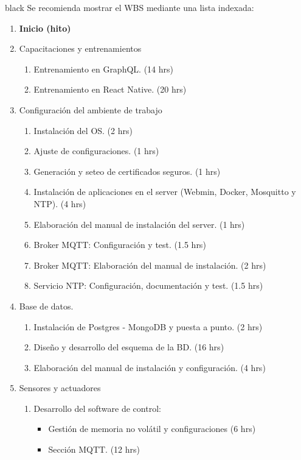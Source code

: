 \documentclass[11pt]{charter}
\begin{document}
\begin{consigna}{black}
Se recomienda mostrar el WBS mediante una lista indexada:

\begin{enumerate}
\item \textbf{Inicio (hito)}
\item Capacitaciones y entrenamientos
	\begin{enumerate}
		\item Entrenamiento en GraphQL. (14 hrs)
		\item Entrenamiento en React Native. (20 hrs)
	\end{enumerate}
\item Configuración del ambiente de trabajo
	\begin{enumerate}
		\item Instalación del OS. (2 hrs)
		\item Ajuste de configuraciones. (1 hrs)
		\item Generación y seteo de certificados seguros. (1 hrs)
		\item Instalación de aplicaciones en el server (Webmin, Docker, Mosquitto y NTP). (4 hrs)
		\item Elaboración del manual de instalación del server. (1 hrs)
		\item Broker MQTT: Configuración y test. (1.5 hrs)
		\item Broker MQTT: Elaboración del manual de instalación. (2 hrs)
		\item Servicio NTP: Configuración, documentación y test. (1.5 hrs)
	\end{enumerate}
\item Base de datos.
	\begin{enumerate}
		\item Instalación de Postgres - MongoDB y puesta a punto. (2 hrs)
		\item Diseño y desarrollo del esquema de la BD. (16 hrs)
		\item Elaboración del manual de instalación y configuración. (4 hrs)
	\end{enumerate}
\item Sensores y actuadores
	\begin{enumerate}
		\item Desarrollo del software de control:
		\begin{itemize}
			\item Gestión de memoria no volátil y configuraciones (6 hrs)
			\item Sección MQTT. (12 hrs)

\end{itemize}
\end{enumerate}
\end{enumerate}
\end{consigna}
\end{document}
